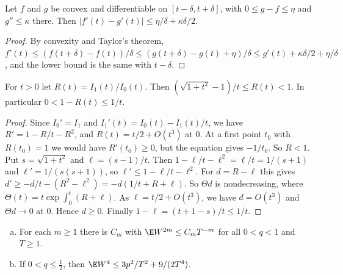 \begin{lemma}[convexity]\label{lem:fisher-convex}
Let $f$ and $g$ be convex and differentiable on $[t-\delta,t+\delta]$, with
$0\le g-f\le\eta$ and $g''\le\kappa$ there. Then
$|f'(t)-g'(t)|\le\eta/\delta+\kappa\delta/2$.
\end{lemma}

\begin{proof}
By convexity and Taylor's theorem,
$f'(t)\le(f(t+\delta)-f(t))/\delta\le(g(t+\delta)-g(t)+\eta)/\delta
\le g'(t)+\kappa\delta/2+\eta/\delta$, and the lower bound is the same with
$t-\delta$.
\end{proof}

\begin{lemma}\label{lem:fisher-bessel}
For $t>0$ let $R(t)=I_1(t)/I_0(t)$. Then
$(\sqrt{1+t^2}-1)/t\le R(t)<1$. In particular $0<1-R(t)\le1/t$.
\end{lemma}

\begin{proof}
Since $I_0'=I_1$ and $I_1'(t)=I_0(t)-I_1(t)/t$, we have $R'=1-R/t-R^2$, and
$R(t)=t/2+O(t^3)$ at $0$. At a first point $t_0$ with $R(t_0)=1$ we would
have $R'(t_0)\ge0$, but the equation gives $-1/t_0$. So $R<1$. Put
$s=\sqrt{1+t^2}$ and $\ell=(s-1)/t$. Then $1-\ell/t-\ell^2=\ell/t=1/(s+1)$ and
$\ell'=1/(s(s+1))$, so $\ell'\le1-\ell/t-\ell^2$. For $d=R-\ell$ this gives
$d'\ge-d/t-(R^2-\ell^2)=-d(1/t+R+\ell)$. So $\Theta d$ is nondecreasing, where
$\Theta(t)=t\exp\int_0^t(R+\ell)$. As $\ell=t/2+O(t^3)$, we have
$d=O(t^3)$ and $\Theta d\to0$ at $0$. Hence $d\ge0$. Finally
$1-\ell=(t+1-s)/t\le1/t$.
\end{proof}

\begin{lemma}\label{lem:fisher-W}
\begin{enumerate}[(a)]
\item For each $m\ge1$ there is $C_m$ with $\E W^{2m}\le C_mT^{-m}$ for all
$0<q<1$ and $T\ge1$.
\item If $0<q\le\frac12$, then $\E W^4\le3p^2/T^2+9/(2T^4)$.
\end{enumerate}
\end{lemma}

